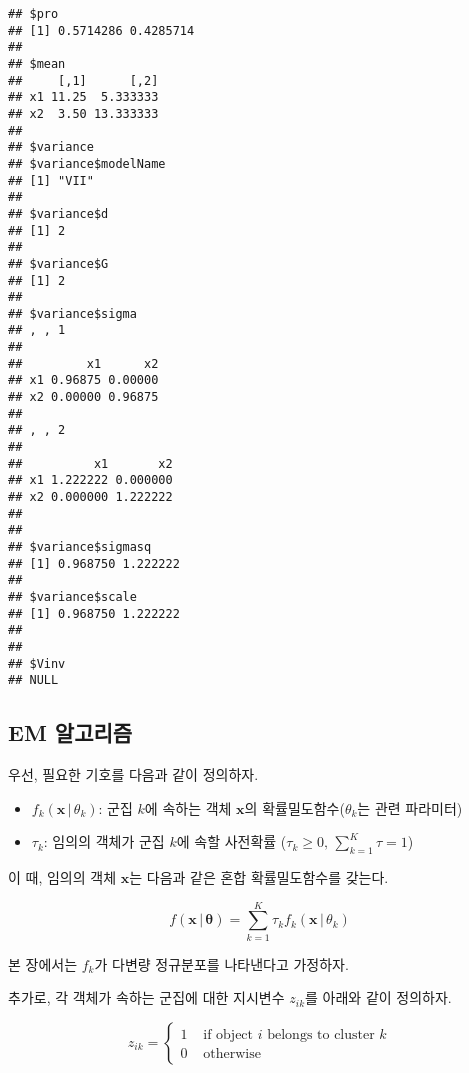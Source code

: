 \documentclass[]{book}
\newenvironment{Shaded}{\begin{snugshade}}{\end{snugshade}}
\newcommand{\CommentTok}[1]{\textcolor[rgb]{0.56,0.35,0.01}{\textit{#1}}}
\newcommand{\NormalTok}[1]{#1}
\newcommand{\OperatorTok}[1]{\textcolor[rgb]{0.81,0.36,0.00}{\textbf{#1}}}
\providecommand{\tightlist}{%
  \setlength{\itemsep}{0pt}\setlength{\parskip}{0pt}}
\begin{document}
\begin{Shaded}
\end{Shaded}

\begin{verbatim}
## $pro
## [1] 0.5714286 0.4285714
## 
## $mean
##     [,1]      [,2]
## x1 11.25  5.333333
## x2  3.50 13.333333
## 
## $variance
## $variance$modelName
## [1] "VII"
## 
## $variance$d
## [1] 2
## 
## $variance$G
## [1] 2
## 
## $variance$sigma
## , , 1
## 
##         x1      x2
## x1 0.96875 0.00000
## x2 0.00000 0.96875
## 
## , , 2
## 
##          x1       x2
## x1 1.222222 0.000000
## x2 0.000000 1.222222
## 
## 
## $variance$sigmasq
## [1] 0.968750 1.222222
## 
## $variance$scale
## [1] 0.968750 1.222222
## 
## 
## $Vinv
## NULL
\end{verbatim}

\hypertarget{model-based-clustering-em}{%
\subsection{EM 알고리즘}\label{model-based-clustering-em}}

우선, 필요한 기호를 다음과 같이 정의하자.

\begin{itemize}
\tightlist
\item
  \(f_k(\mathbf{x} \, | \, \theta_k)\): 군집 \(k\)에 속하는 객체 \(\mathbf{x}\)의 확률밀도함수(\(\theta_k\)는 관련 파라미터)
\item
  \(\tau_k\): 임의의 객체가 군집 \(k\)에 속할 사전확률 (\(\tau_k \geq 0, \, \sum_{k = 1}^{K} \tau = 1\))
\end{itemize}

이 때, 임의의 객체 \(\mathbf{x}\)는 다음과 같은 혼합 확률밀도함수를 갖는다.

\begin{equation*}
f(\mathbf{x} \, | \, \boldsymbol\theta) = \sum_{k = 1}^{K} \tau_k f_k(\mathbf{x} \, | \, \theta_k)
\end{equation*}

본 장에서는 \(f_k\)가 다변량 정규분포를 나타낸다고 가정하자.

추가로, 각 객체가 속하는 군집에 대한 지시변수 \(z_{ik}\)를 아래와 같이 정의하자.

\begin{equation*}
z_{ik} = \begin{cases}
1 & \text{ if object $i$ belongs to cluster $k$} \\
0 & \text{ otherwise}
\end{cases}
\end{equation*}
\end{document}
